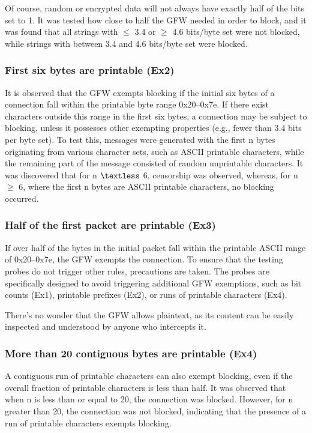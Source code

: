 Of course, random or encrypted data will not always have exactly half of the bits set to 1. It was tested how close to half the GFW needed in order to block, and it was found that all strings with $\leq$ 3.4 or $\geq$ 4.6 bits/byte set were not blocked, while strings with between 3.4 and 4.6 bits/byte set were blocked.

\subsubsection{First six bytes are printable (Ex2)}
It is observed that the GFW exempts blocking if the initial six bytes of a connection fall within the printable byte range 0x20–0x7e. If there exist characters outside this range in the first six bytes, a connection may be subject to blocking, unless it possesses other exempting properties (e.g., fewer than 3.4 bits per byte set). To test this, messages were generated with the first n bytes originating from various character sets, such as ASCII printable characters, while the remaining part of the message consisted of random unprintable characters. It was discovered that for n $\textless$ 6, censorship was observed, whereas, for n $\geq$ 6, where the first n bytes are ASCII printable characters, no blocking occurred.

\subsubsection{Half of the first packet are printable (Ex3)}
If over half of the bytes in the initial packet fall within the printable ASCII range of 0x20–0x7e, the GFW exempts the connection. To ensure that the testing probes do not trigger other rules, precautions are taken. The probes are specifically designed to avoid triggering additional GFW exemptions, such as bit counts (Ex1), printable prefixes (Ex2), or runs of printable characters (Ex4). 

There's no wonder that the GFW allows plaintext, as its content can be easily inspected and understood by anyone who intercepts it.

\subsubsection{More than 20 contiguous bytes are printable (Ex4)}
A contiguous run of printable characters can also exempt blocking, even if the overall fraction of printable characters is less than half. It was observed that when n is less than or equal to 20, the connection was blocked. However, for n greater than 20, the connection was not blocked, indicating that the presence of a run of printable characters exempts blocking.


